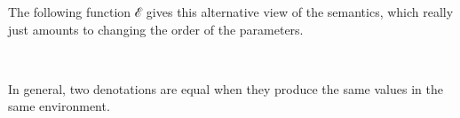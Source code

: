 The following function ℰ gives this alternative view of the semantics,
which really just amounts to changing the order of the parameters.

\begin{fence}
\begin{code}%
\>[0]\AgdaSpace{}%
\AgdaSymbol{:}\AgdaSpace{}%
\AgdaSymbol{\}}\AgdaSpace{}%
\AgdaSpace{}%
\AgdaSymbol{(}\AgdaSpace{}%
\AgdaSymbol{:}\AgdaSpace{}%
\AgdaSpace{}%
\AgdaSpace{}%
\AgdaSymbol{)}\AgdaSpace{}%
\AgdaSpace{}%
\AgdaSpace{}%
\<%
\\
\>[0]\AgdaSpace{}%
\AgdaSpace{}%
\AgdaSymbol{=}\AgdaSpace{}%
\AgdaSpace{}%
\AgdaSpace{}%
\AgdaSpace{}%
\AgdaSpace{}%
\AgdaSpace{}%
\AgdaSpace{}%
\AgdaSpace{}%
\AgdaSpace{}%
\<%
\end{code}
\end{fence}

In general, two denotations are equal when they produce the same values
in the same environment.

\begin{fence}
\begin{code}%
\>[0]\AgdaSpace{}%
\AgdaSpace{}%
\<%
\\
%
\\[\AgdaEmptyExtraSkip]%
\>[0]\AgdaSpace{}%
\AgdaSymbol{:}\AgdaSpace{}%
\AgdaSpace{}%
\AgdaSymbol{\{}\AgdaSymbol{\}}\AgdaSpace{}%
\AgdaSpace{}%
\AgdaSymbol{(}\AgdaSpace{}%
\AgdaSymbol{)}\AgdaSpace{}%
\AgdaSpace{}%
\AgdaSymbol{(}\AgdaSpace{}%
\AgdaSymbol{)}\AgdaSpace{}%
\AgdaSpace{}%
\<%
\\
\>[0]\AgdaSymbol{(}\AgdaSpace{}%
\AgdaSymbol{\{}\AgdaSymbol{\}}\AgdaSpace{}%
\AgdaSpace{}%
\AgdaSymbol{)}\AgdaSpace{}%
\AgdaSymbol{=}\AgdaSpace{}%
\AgdaSymbol{(}\AgdaSpace{}%
\AgdaSymbol{:}\AgdaSpace{}%
\AgdaSpace{}%
\AgdaSymbol{)}\AgdaSpace{}%
\AgdaSpace{}%
\AgdaSymbol{(}\AgdaSpace{}%
\AgdaSymbol{:}\AgdaSpace{}%
\AgdaSymbol{)}\AgdaSpace{}%
\AgdaSpace{}%
\AgdaSpace{}%
\AgdaSpace{}%
\AgdaSpace{}%
\AgdaSpace{}%
\AgdaSpace{}%
\AgdaSpace{}%
\<%
\end{code}
\end{fence}


